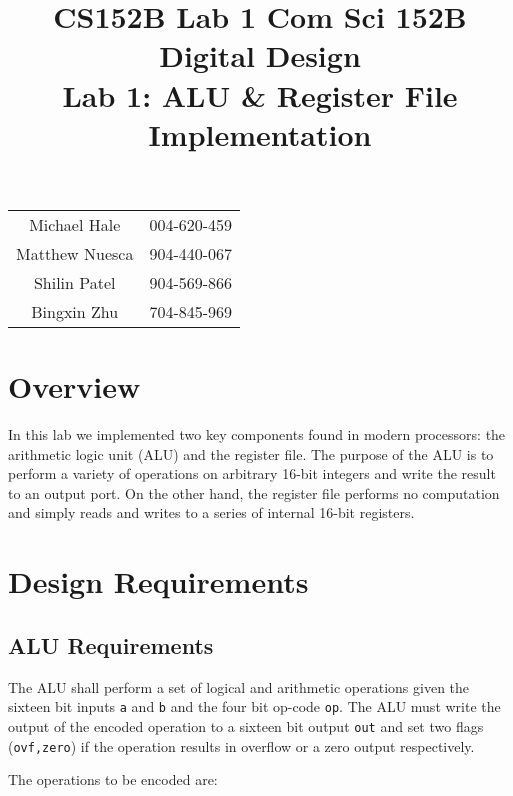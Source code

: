 \documentclass[11pt]{article}
\title{CS152B Lab 1}
\begin{document}
	
\title{\vspace{-1.0in} Com Sci 152B Digital Design \\
	Lab 1: ALU \& Register File Implementation }
\date{}
\maketitle
\vspace{-0.75in}
\begin{center}
\begin{tabular}{cc}
	Michael Hale & 004-620-459 \\ 
	Matthew Nuesca & 904-440-067 \\ 
	Shilin Patel & 904-569-866 \\ 
	Bingxin Zhu & 704-845-969
\end{tabular}
\end{center}

\section{Overview}

In this lab we implemented two key components found in modern processors: the arithmetic logic unit (ALU) and the register file. The purpose of the ALU is to perform a variety of operations on arbitrary 16-bit integers and write the result to an output port. On the other hand, the register file performs no computation and simply reads and writes to a series of internal 16-bit registers. 

\section{Design Requirements}
\subsection{ALU Requirements}
The ALU shall perform a set of logical and arithmetic operations given the sixteen bit inputs \texttt{a} and \texttt{b} and the four bit op-code \texttt{op}. The ALU must write the output of the encoded operation to a sixteen bit output \texttt{out} and set two flags (\texttt{ovf,zero}) if the operation results in overflow or a zero output respectively. 

The operations to be encoded are: \\
\end{document}
